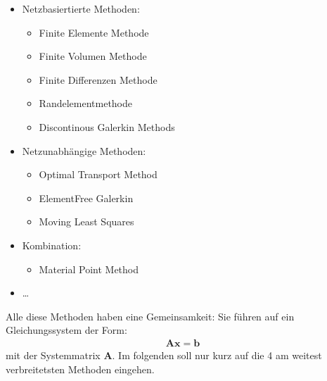 \documentclass[letterpaper,10pt,german]{jupyterBook}
\begin{document}
\begin{itemize}
\item {} 
\sphinxAtStartPar
Netzbasiertierte Methoden:
\begin{itemize}
\item {} 
\sphinxAtStartPar
Finite Elemente Methode 

\item {} 
\sphinxAtStartPar
Finite Volumen Methode 

\item {} 
\sphinxAtStartPar
Finite Differenzen Methode 

\item {} 
\sphinxAtStartPar
Randelementmethode 

\item {} 
\sphinxAtStartPar
Discontinous Galerkin Methods 

\end{itemize}

\item {} 
\sphinxAtStartPar
Netzunabhängige Methoden:
\begin{itemize}
\item {} 
\sphinxAtStartPar
Optimal Transport Method 

\item {} 
\sphinxAtStartPar
Element\sphinxhyphen{}Free Galerkin 

\item {} 
\sphinxAtStartPar
Moving Least Squares 

\end{itemize}

\item {} 
\sphinxAtStartPar
Kombination:
\begin{itemize}
\item {} 
\sphinxAtStartPar
Material Point Method 

\end{itemize}

\item {} 
\sphinxAtStartPar
…

\end{itemize}

\sphinxAtStartPar
Alle diese Methoden haben eine Gemeinsamkeit: Sie führen auf ein Gleichungssystem der Form:
\begin{equation}\label{equation:chapters/chapter1/Einführung_Loesungsverfahren:LGS}
\begin{split}\boldsymbol{Ax}=\boldsymbol{b} \end{split}
\end{equation}
\sphinxAtStartPar
mit der Systemmatrix \(\boldsymbol{A}\). Im folgenden soll nur kurz auf die 4 am weitest verbreitetsten Methoden eingehen.
\end{document}
